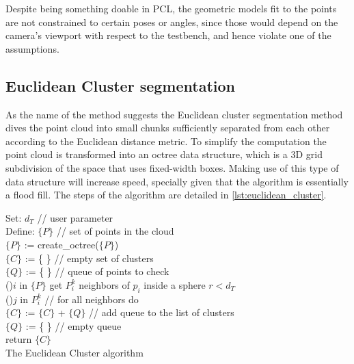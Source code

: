 \documentclass[../main.tex]{subfiles}
\begin{document}
Despite being something doable in PCL, the geometric models fit to the points are not constrained to certain poses or angles, since those would depend on the camera's viewport with respect to the testbench, and hence violate one of the assumptions.

\subsection{Euclidean Cluster segmentation} \label{sec:euclidean_segmentation}
As the name of the method suggests the Euclidean cluster segmentation method dives the point cloud into small chunks sufficiently separated from each other according to the Euclidean distance metric. To simplify the computation the point cloud is transformed into an octree \cite{octree_techrepo} data structure, which is a 3D grid subdivision of the space that uses fixed-width boxes. Making use of this type of data structure will increase speed, specially given that the algorithm is essentially a flood fill. The steps of the algorithm are detailed in \ref{lst:euclidean_cluster}.

\begin{algorithm}[h]
    \SetAlgoLined
    Set: $d_{T}$ // user parameter\\
    Define: $\{P\}$ // set of points in the cloud \\
    $\{P\}$ := create\_octree($\{P\}$) \\
    $\{C\}$ := \{ \} // empty set of clusters \\
    $\{Q\}$ := \{ \} // queue of points to check \\
    \For(){$i$ in $\{P\}$}{
        get $P_{i}^{k}$ neighbors of $p_{i}$ inside a sphere $r < d_{T}$ \\
        \For(){$j$ in $P_{i}^{k}$}{
            // for all neighbors do \\
        }
        $\{C\}$ := $\{C\}$ + $\{Q\}$ // add queue to the list of clusters \\
        $\{Q\}$ := \{ \} // empty queue \\
    }        
    return $\{C\}$\\
    \caption{The Euclidean Cluster algorithm}
    \label{lst:euclidean_cluster}
\end{algorithm}
\end{document}
